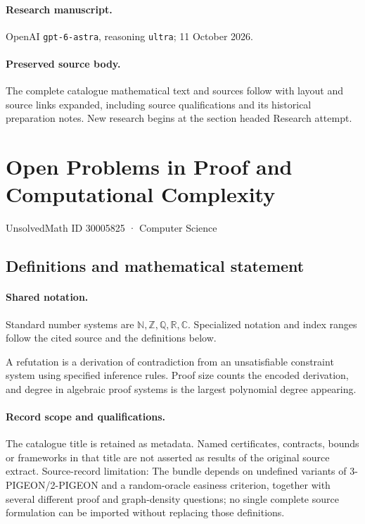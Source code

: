 \documentclass[11pt]{article}
\begin{document}
\paragraph{Research manuscript.} OpenAI \texttt{gpt-6-astra}, reasoning \texttt{ultra}; 11 October 2026.
\paragraph{Preserved source body.} The complete catalogue mathematical text and sources follow with layout and source links expanded, including source qualifications and its historical preparation notes. New research begins at the section headed Research attempt.

\section{Open Problems in Proof and Computational Complexity}\label{30005825}
{\small UnsolvedMath ID 30005825 · Computer Science}
\subsection{Definitions and mathematical statement}

\paragraph{Shared notation.}Standard number systems are $\mathbb N,\mathbb Z,\mathbb Q,\mathbb R,\mathbb C$. Specialized notation and index ranges follow the cited source and the definitions below.


A refutation is a derivation of contradiction from an unsatisfiable constraint system using specified inference rules. Proof size counts the encoded derivation, and degree in algebraic proof systems is the largest polynomial degree appearing.
\paragraph{Record scope and qualifications.}
The catalogue title is retained as metadata. Named certificates, contracts, bounds or frameworks in that title are not asserted as results of the original source extract.
Source-record limitation: The bundle depends on undefined variants of 3-PIGEON/2-PIGEON and a random-oracle easiness criterion, together with several different proof and graph-density questions; no single complete source formulation can be imported without replacing those definitions.
\end{document}
